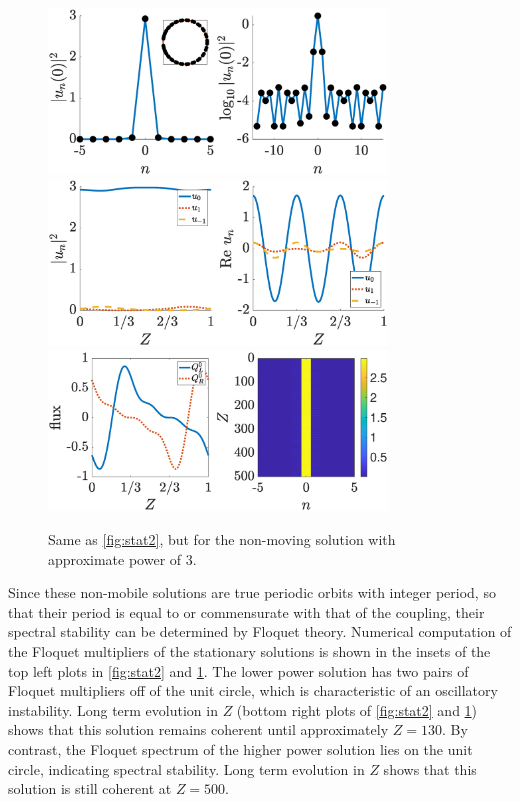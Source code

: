 \documentclass[reprint, amsmath,amssymb,aps,pre]{revtex4-2}
\begin{document}
\begin{figure}
    \centering
    \includegraphics[width=9cm]{stat3a.eps}
    \includegraphics[width=9cm]{stat3b.eps}
    \includegraphics[width=9cm]{stat3c.eps}
    \caption{Same as \cref{fig:stat2}, but for the non-moving solution with approximate power of 3.}
    \label{fig:stat3}
\end{figure}

Since these non-mobile solutions are true periodic orbits with integer period, so that their period is equal to or commensurate with that of the coupling, their spectral stability can be determined by Floquet theory. Numerical computation of the Floquet multipliers of the stationary solutions is shown in the insets of the top left plots in \cref{fig:stat2} and \cref{fig:stat3}. The lower power solution has two pairs of Floquet multipliers off of the unit circle, which is characteristic of an oscillatory instability. Long term evolution in $Z$ (bottom right plots of \cref{fig:stat2} and \cref{fig:stat3}) shows that this solution remains coherent until approximately $Z=130$. By contrast, the Floquet spectrum of the higher power solution lies on the unit circle, indicating spectral stability. Long term evolution in $Z$ shows that this solution is still coherent at $Z=500$.
\end{document}
